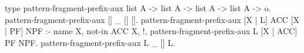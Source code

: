 type pattern-fragment-prefix-aux list A -> list A -> list A -> list A -> o.
pattern-fragment-prefix-aux [] _ [] [].
pattern-fragment-prefix-aux [X | L] ACC [X | PF] NPF :- name X, not-in ACC X, !, 
  pattern-fragment-prefix-aux L [X | ACC] PF NPF.
pattern-fragment-prefix-aux L _ [] L.
